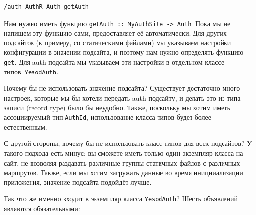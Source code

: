 \begin{lstlisting}
/auth AuthR Auth getAuth
\end{lstlisting}

Нам нужно иметь функцию \lstinline'getAuth :: MyAuthSite -> Auth'. Пока мы не
напишем эту функцию сами,
предоставляет её автоматически. Для других подсайтов (к примеру, со
статическими файлами) мы указываем настройки конфигурации в значении подсайта,
и поэтому нам нужно определять функцию \lstinline'get'. Для auth-подсайта мы
указываем эти настройки в отдельном классе типов~\lstinline'YesodAuth'.

\begin{remark}
    Почему бы не использовать значение подсайта? Существует достаточно много
    настроек, которые мы бы хотели передать auth-подсайту, и делать это из типа
    записи (record type) было бы неудобно. Также, поскольку мы хотим иметь
    ассоциируемый тип \lstinline'AuthId', использование класса типов будет
    более естественным.

    С другой стороны, почему бы не использовать класс типов для всех подсайтов?
    У такого подхода есть минус: вы сможете иметь только один экземпляр класса
    на сайт, не позволяя раздавать различные группы статичных файлов с
    различных маршрутов. Также, если мы хотим загружать данные во время
    иницииализации приложения, значение подсайта подойдёт лучше.
\end{remark}

Так что же именно входит в экземпляр класса \lstinline'YesodAuth'? Шесть
объявлений являются обязательными:

